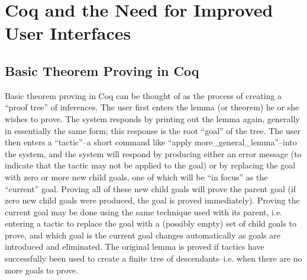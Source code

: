 \documentclass[11pt]{amsart}
\begin{document}
\section{Coq and the Need for Improved User Interfaces}

\subsection{Basic Theorem Proving in Coq}

Basic theorem proving in Coq can be thought of as the process of creating a ``proof tree'' of inferences.  The user first enters the lemma (or theorem) he or she wishes to prove.  The system responds by printing out the lemma again, generally in essentially the same form; this response is the root ``goal'' of the tree.  The user then enters a ``tactic''--a short command like ``apply more\_general\_lemma''--into the system, and the system will respond by producing either an error message (to indicate that the tactic may not be applied to the goal) or by replacing the goal with zero or more new child goals, one of which will be ``in focus'' as the ``current'' goal.  Proving all of these new child goals will prove the parent goal (if zero new child goals were produced, the goal is proved immediately).  Proving the current goal may be done using the same technique used with its parent, i.e. entering a tactic to replace the goal with a (possibly empty) set of child goals to prove, and which goal is the current goal changes automatically as goals are introduced and eliminated.  The original lemma is proved if tactics have successfully been used to create a finite tree of descendants--i.e. when there are no more goals to prove.
\end{document}
